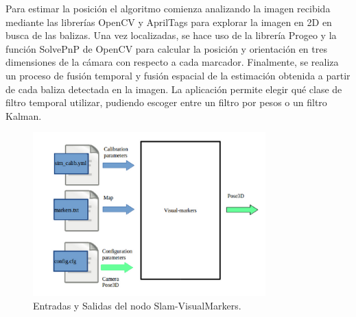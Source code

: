 \hspace{1cm} Para estimar la posición el algoritmo comienza analizando la imagen recibida mediante las librerías OpenCV y AprilTags para explorar la imagen en 2D en busca de las balizas. Una vez localizadas, se hace uso de la librería Progeo y la función SolvePnP de OpenCV para calcular la posición y orientación en tres dimensiones de la cámara con respecto a cada marcador. Finalmente, se realiza un proceso de fusión temporal y fusión espacial de la estimación obtenida a partir de cada baliza detectada en la imagen. La aplicación permite elegir qué clase de filtro temporal utilizar, pudiendo escoger entre un filtro por pesos o un filtro Kalman.

\begin{figure}[H]
	\begin{center}
		\includegraphics[width=0.8\textwidth]{imag/IMG23.png}
				\caption{Entradas y Salidas del nodo Slam-VisualMarkers.} 
	\label{fig:Entradas y Salidas del nodo.}	
	\end{center}
\end{figure}
